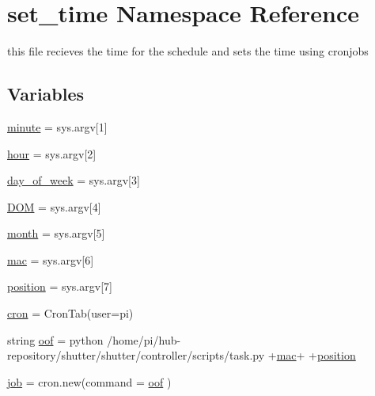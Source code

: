 \hypertarget{namespaceset__time}{}\section{set\+\_\+time Namespace Reference}
\label{namespaceset__time}


this file recieves the time for the schedule and sets the time using cronjobs  


\subsection*{Variables}
\begin{DoxyCompactItemize}
\item 
\hyperlink{namespaceset__time_aac07b96e110bddcafecbb0249a2b1b22}{minute} = sys.\+argv\mbox{[}1\mbox{]}
\item 
\hyperlink{namespaceset__time_a9b9cd4838ca6ba8e8653b93ec5bf1ccd}{hour} = sys.\+argv\mbox{[}2\mbox{]}
\item 
\hyperlink{namespaceset__time_a0d28e53eeaf0bdbab2f1719272f31912}{day\+\_\+of\+\_\+week} = sys.\+argv\mbox{[}3\mbox{]}
\item 
\hyperlink{namespaceset__time_aa07c97b77846215f6e507c5c01c9c340}{D\+OM} = sys.\+argv\mbox{[}4\mbox{]}
\item 
\hyperlink{namespaceset__time_a1985921767360034acf361d528c1ed40}{month} = sys.\+argv\mbox{[}5\mbox{]}
\item 
\hyperlink{namespaceset__time_a7d323bbf3d79eac87d5851d0b1389561}{mac} = sys.\+argv\mbox{[}6\mbox{]}
\item 
\hyperlink{namespaceset__time_a0c50bf42014a5648a86abdcee8bf1069}{position} = sys.\+argv\mbox{[}7\mbox{]}
\item 
\hyperlink{namespaceset__time_a5ff4dfadfd2f8d3122de7fbb7315f4cf}{cron} = Cron\+Tab(user=\textquotesingle{}pi\textquotesingle{})
\item 
string \hyperlink{namespaceset__time_af2ed09847fd976695336fbf8bbfcfd56}{oof} = \textquotesingle{}python /home/pi/hub-\/repository/shutter/shutter/controller/scripts/task.\+py \textquotesingle{}+\hyperlink{namespaceset__time_a7d323bbf3d79eac87d5851d0b1389561}{mac}+\textquotesingle{} \textquotesingle{}+\hyperlink{namespaceset__time_a0c50bf42014a5648a86abdcee8bf1069}{position}
\item 
\hyperlink{namespaceset__time_a426ad1636cada91a1e8d7afad962d791}{job} = cron.\+new(command = \hyperlink{namespaceset__time_af2ed09847fd976695336fbf8bbfcfd56}{oof} )
\end{DoxyCompactItemize}


